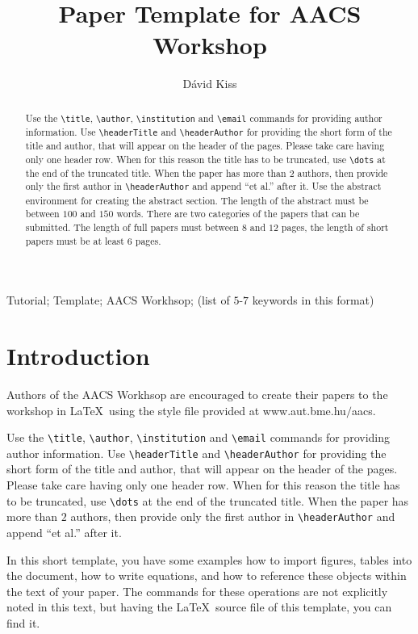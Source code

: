 \documentclass[twoside,b5paper,10pt]{article}
\title{Paper Template for AACS Workshop }
\author{Dávid Kiss}
\begin{document}
\makeAutStyleTitle


\begin{abstract}
Use the \verb|\title|, \verb|\author|, \verb|\institution| and
\verb|\email| commands for providing author information.
Use \verb|\headerTitle| and \verb|\headerAuthor| for providing the short form of the title and author, that will appear on the header of the pages. Please take care having only one header row. When for this reason the title has to be truncated, use \verb|\dots| at the end of the truncated title. When the paper has more than $2$ authors, then provide only the first author in \verb|\headerAuthor| and append ``et al.'' after it.
Use the abstract environment for creating the abstract section. The length
of the abstract must be between $100$ and $150$ words. There are two
categories of the papers that can be submitted. The length of full
papers must between $8$ and $12$ pages, the length of short papers must
be at least $6$ pages.
\end{abstract}


\begin{keywords}
Tutorial; Template; AACS Workhsop; (list of $5$-$7$ keywords in this
format)
\end{keywords}

\section{Introduction}
\label{sec:Introdu}

Authors of the AACS Workhsop are encouraged to create their papers
to the workshop in \LaTeX \ using the style file provided at
www.aut.bme.hu$\slash$aacs.

Use the \verb|\title|, \verb|\author|, \verb|\institution| and
\verb|\email| commands for providing author information.
Use \verb|\headerTitle| and \verb|\headerAuthor| for providing the short form of the title and author, that will appear on the header of the pages. Please take care having only one header row. When for this reason the title has to be truncated, use \verb|\dots| at the end of the truncated title. When the paper has more than $2$ authors, then provide only the first author in \verb|\headerAuthor| and append ``et al.'' after it.

In this short template, you have some examples how to import
figures, tables into the document, how to write equations, and how
to reference these objects within the text of your paper. The
commands for these operations are not explicitly noted in this text,
but having the \LaTeX \ source file of this template, you can find
it.
\end{document}
